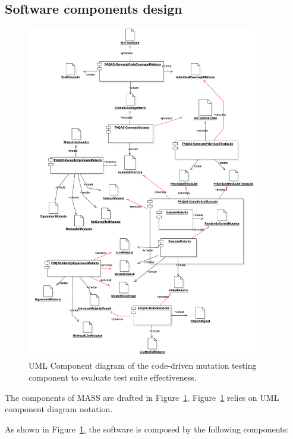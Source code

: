 \clearpage

\subsection{Software components design}
\label{sec:component:design}
\begin{figure}[tb]
  \centering
	\includegraphics[width=0.9\textwidth]{images/component.png}
      \caption{UML Component diagram of the code-driven mutation testing component to evaluate test suite effectiveness.}
      \label{fig:component_diagram}
\end{figure}

The components of MASS are drafted in Figure~\ref{fig:component_diagram}. Figure~\ref{fig:component_diagram} relies on UML component diagram notation.

As shown in Figure~\ref{fig:component_diagram}, the software is composed by the following components:

